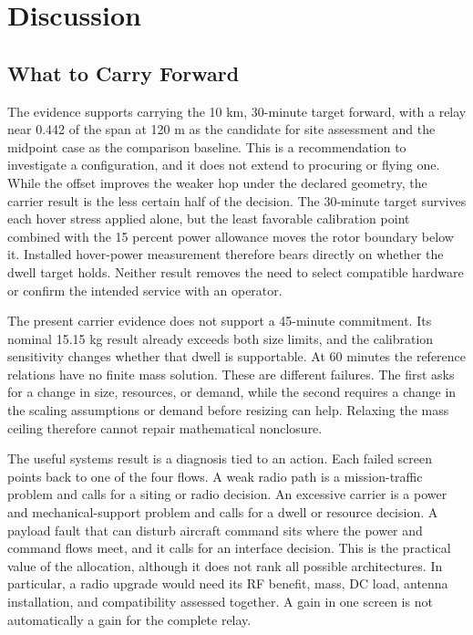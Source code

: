 \documentclass[twocolumn,letterpaper]{IEEEAerospaceCLS}
\begin{document}
\section{Discussion}\label{sec:discussion}

\subsection{What to Carry Forward}

The evidence supports carrying the 10 km, 30-minute target forward, with a relay near 0.442 of the span at 120 m as the candidate for site assessment and the midpoint case as the comparison baseline. This is a recommendation to investigate a configuration, and it does not extend to procuring or flying one. While the offset improves the weaker hop under the declared geometry, the carrier result is the less certain half of the decision. The 30-minute target survives each hover stress applied alone, but the least favorable calibration point combined with the 15 percent power allowance moves the rotor boundary below it. Installed hover-power measurement therefore bears directly on whether the dwell target holds. Neither result removes the need to select compatible hardware or confirm the intended service with an operator.

The present carrier evidence does not support a 45-minute commitment. Its nominal 15.15 kg result already exceeds both size limits, and the calibration sensitivity changes whether that dwell is supportable. At 60 minutes the reference relations have no finite mass solution. These are different failures. The first asks for a change in size, resources, or demand, while the second requires a change in the scaling assumptions or demand before resizing can help. Relaxing the mass ceiling therefore cannot repair mathematical nonclosure.

The useful systems result is a diagnosis tied to an action. Each failed screen points back to one of the four flows. A weak radio path is a mission-traffic problem and calls for a siting or radio decision. An excessive carrier is a power and mechanical-support problem and calls for a dwell or resource decision. A payload fault that can disturb aircraft command sits where the power and command flows meet, and it calls for an interface decision. This is the practical value of the allocation, although it does not rank all possible architectures. In particular, a radio upgrade would need its RF benefit, mass, DC load, antenna installation, and compatibility assessed together. A gain in one screen is not automatically a gain for the complete relay.
\end{document}
